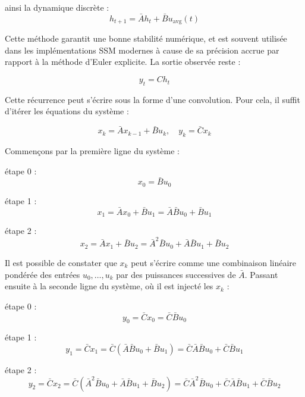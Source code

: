 ainsi la dynamique discrète :
\begin{equation}
    h_{t+1} = \bar{A} h_t + \bar{B} u_{\text{avg}}(t)
\end{equation}

Cette méthode garantit une bonne stabilité numérique, et est souvent utilisée dans les implémentations SSM modernes à cause de sa précision accrue par rapport à la méthode d’Euler explicite. La sortie observée reste :

\begin{equation}
    y_t = C h_t
\end{equation}

Cette récurrence peut s’écrire sous la forme d’une convolution. Pour cela, il suffit d’itérer les équations du système :

\begin{equation}
    x_k = \bar{A} x_{k-1} + \bar{B} u_k, \quad y_k = \bar{C} x_k
\end{equation}

Commençons par la première ligne du système :

étape 0 :
\begin{equation*}
    x_0 = \bar{B} u_0
\end{equation*}

étape 1 :
\begin{equation*}
    x_1 = \bar{A} x_0 + \bar{B} u_1 = \bar{A} \bar{B} u_0 + \bar{B} u_1
\end{equation*}

étape 2 :
\begin{equation*}
    x_2 = \bar{A} x_1 + \bar{B} u_2 = \bar{A}^2 \bar{B} u_0 + \bar{A} \bar{B} u_1 + \bar{B} u_2
\end{equation*}

Il est possible de constater que $x_k$ peut s’écrire comme une combinaison linéaire pondérée des entrées $u_0, \dots, u_k$ par des puissances successives de $\bar{A}$. Passant ensuite à la seconde ligne du système, où il est injecté les $x_k$ :

étape 0 :
\begin{equation*}
    y_0 = \bar{C} x_0 = \bar{C} \bar{B} u_0
\end{equation*}

étape 1 :
\begin{equation*}
    y_1 = \bar{C} x_1 = \bar{C} (\bar{A} \bar{B} u_0 + \bar{B} u_1) = \bar{C} \bar{A} \bar{B} u_0 + \bar{C} \bar{B} u_1
\end{equation*}

étape 2 :
\begin{equation*}
    y_2 = \bar{C} x_2 = \bar{C} (\bar{A}^2 \bar{B} u_0 + \bar{A} \bar{B} u_1 + \bar{B} u_2) = \bar{C} \bar{A}^2 \bar{B} u_0 + \bar{C} \bar{A} \bar{B} u_1 + \bar{C} \bar{B} u_2
\end{equation*}

